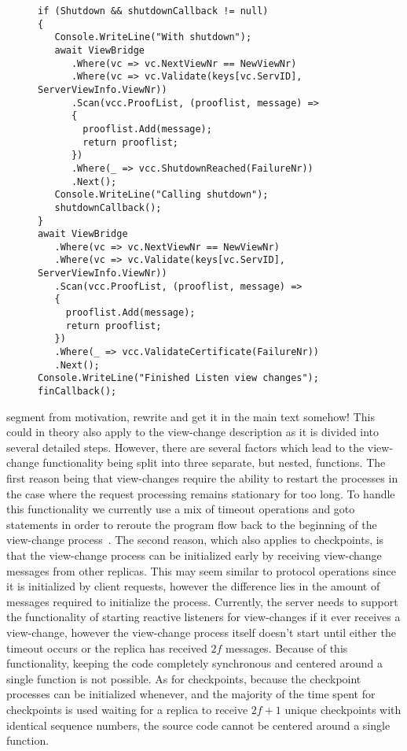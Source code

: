 \begin{figure}[H]
	\centering
	\begin{lstlisting}[label = code:viewListener, caption=Source code for View-Change Listener, captionpos = b, basicstyle=\scriptsize]
if (Shutdown && shutdownCallback != null)
{
   Console.WriteLine("With shutdown");
   await ViewBridge
      .Where(vc => vc.NextViewNr == NewViewNr)
      .Where(vc => vc.Validate(keys[vc.ServID], ServerViewInfo.ViewNr))
      .Scan(vcc.ProofList, (prooflist, message) =>
      {
        prooflist.Add(message);
        return prooflist;
      })
      .Where(_ => vcc.ShutdownReached(FailureNr))
      .Next();
   Console.WriteLine("Calling shutdown");
   shutdownCallback();
}
await ViewBridge
   .Where(vc => vc.NextViewNr == NewViewNr)
   .Where(vc => vc.Validate(keys[vc.ServID], ServerViewInfo.ViewNr))
   .Scan(vcc.ProofList, (prooflist, message) =>
   {
     prooflist.Add(message);
     return prooflist;
   })
   .Where(_ => vcc.ValidateCertificate(FailureNr))
   .Next();
Console.WriteLine("Finished Listen view changes");
finCallback();
    \end{lstlisting}
\end{figure} 
segment from motivation, rewrite and get it in the main text somehow!
This could in theory also apply to the view-change description as it is divided into several detailed steps. However, there are several factors which lead to the view-change functionality being split into three separate, but nested, functions. The first reason being that view-changes require the ability to restart the processes in the case where the request processing remains stationary for too long. To handle this functionality we currently use a mix of timeout operations and goto statements in order to reroute the program flow back to the beginning of the view-change process~\cite{WEB:goto}. The second reason, which also applies to checkpoints, is that the view-change process can be initialized early by receiving view-change messages from other replicas. This may seem similar to protocol operations since it is initialized by client requests, however the difference lies in the amount of messages required to initialize the process. Currently, the server needs to support the functionality of starting reactive listeners for view-changes if it ever receives a view-change, however the view-change process itself doesn't start until either the timeout occurs or the replica has received $2f$ messages. Because of this functionality, keeping the code completely synchronous and centered around a single function is not possible. As for checkpoints, because the checkpoint processes can be initialized whenever, and the majority of the time spent for checkpoints is used waiting for a replica to receive $2f+1$ unique checkpoints with identical sequence numbers, the source code cannot be centered around a single function.
